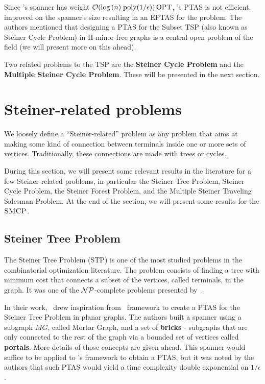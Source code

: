 Since \citeauthor{light_spanners_tsp}'s spanner has weight \(\mathcal{O}(\log{(n)} \; \mathrm{poly}(1 / \epsilon)) \operatorname{\textrm{OPT}}\), \citeauthor{contraction-decomposition-in-h-minor-free-graphs}'s PTAS is not efficient.~\cite{eptas-tsp-h-minor-free} improved on the spanner's size resulting in an EPTAS for the problem. The authors mentioned that designing a PTAS for the Subset TSP (also known as Steiner Cycle Problem) in H-minor-free graphs is a central open problem of the field (we will present more on this ahead).

Two related problems to the TSP are the \textbf{Steiner Cycle Problem} and the \textbf{Multiple Steiner Cycle Problem}. These will be presented in the next section.

\section{Steiner-related problems}

We loosely define a ``Steiner-related'' problem as any problem that aims at making some kind of connection between terminals inside one or more sets of vertices. Traditionally, these connections are made with trees or cycles.

During this section, we will present some relevant results in the literature for a few Steiner-related problems, in particular the Steiner Tree Problem, Steiner Cycle Problem, the Steiner Forest Problem, and the Multiple Steiner Traveling Salesman Problem. At the end of the section, we will present some results for the \(\textsc{SMCP}\).

\subsection{Steiner Tree Problem}

The Steiner Tree Problem (STP) is one of the most studied problems in the combinatorial optimization literature. The problem consists of finding a tree with minimum cost that connects a subset of the vertices, called terminals, in the graph. It was one of the \(\mathcal{NP}\)-complete problems presented by~\cite{Karp1972}.

In their work,~\cite{Borradaile2009b} drew inspiration from~\cite{KleinTSP} framework to create a PTAS for the Steiner Tree Problem in planar graphs. The authors built a spanner using a subgraph \(MG\), called Mortar Graph, and a set of \textbf{bricks} - subgraphs that are only connected to the rest of the graph via a bounded set of vertices called \textbf{portals}. More details of those concepts are given ahead. This spanner would suffice to be applied to \citeauthor{KleinTSP}'s framework to obtain a PTAS, but it was noted by the authors that such PTAS would yield a time complexity double exponential on \(1 / \epsilon\).

